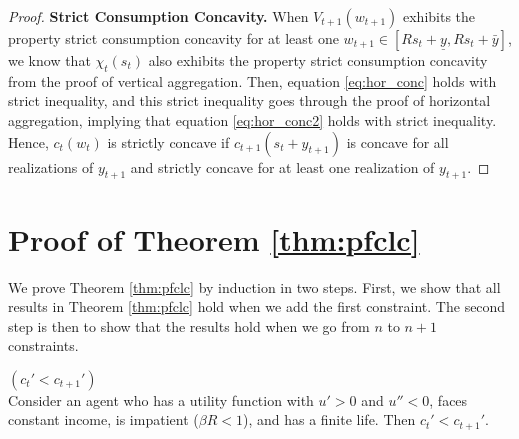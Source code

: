 \begin{proof}
	\bigskip
	\noindent \textbf{Strict Consumption Concavity.}
	When $V_{t+1}(w_{t+1})$ exhibits the property strict consumption concavity for at least one $w_{t+1} \in [Rs_t + \underline{y}, Rs_t + \bar{y}]$, we know that $\chi_t(s_t)$ also exhibits the property strict consumption concavity from the proof of vertical aggregation. Then, equation \eqref{eq:hor_conc} holds with strict inequality, and this strict inequality goes through the proof of horizontal aggregation, implying that equation \eqref{eq:hor_conc2} holds with strict inequality. Hence, $c_t(w_t)$ is strictly concave if $c_{t+1}(s_t + {y}_{t+1})$ is concave for all realizations of ${y}_{t+1}$ and strictly concave for at least one realization of ${y}_{t+1}$.
\end{proof}


\section{Proof of Theorem \ref{thm:pfclc}}\label{app:pfclc}
	We prove Theorem \ref{thm:pfclc} by induction in two steps. First, we show that all results in Theorem \ref{thm:pfclc} hold when we add the first constraint. The second step is then to show that the results hold when we go from $n$ to $n+1$ constraints. 	
	
	\begin{lemma}\textit{$(c_{t}' < c_{t+1}')$} \\
		Consider an agent who has a utility function with $u' > 0$ and $u'' < 0$, faces constant income, is impatient ($\beta R < 1$), and has a finite life. Then $c_{t}' < c_{t+1}'$.
	\end{lemma}
	
